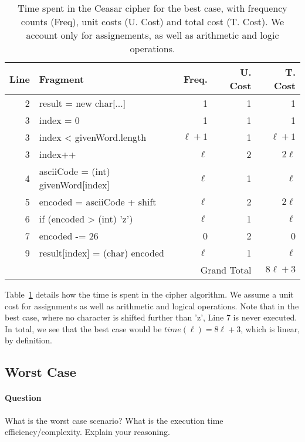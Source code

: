 \documentclass{article}
\begin{document}
\begin{table}[htbp]
  \begin{center}
    \begin{tabular}{r >{\small\ttfamily}l r r r}
      \toprule
      Line & Fragment & Freq. & U. Cost & T. Cost \\
      \midrule
      2 & result = new char[...] & 1 & 1 & 1 \\ 
      3 & index = 0 &  1 & 1 & 1 \\
      3 & index < givenWord.length & $\ell+1$ & 1 & $\ell + 1$ \\
      3 & index++ & $\ell$ & 2 & $2\ell$ \\
      4 & asciiCode = (int) givenWord[index] & $\ell$ & 1 & $\ell$ \\
      5 & encoded = asciiCode + shift & $\ell$ & 2 & $2 \ell$ \\
      6 & if (encoded > (int) 'z') & $\ell$ & 1 & $\ell$ \\
      7 & encoded -= 26 & 0 & 2 & 0 \\
      9 & result[index] = (char) encoded & $\ell$ & 1 & $\ell$ \\
      \midrule
           & & \multicolumn{2}{r}{Grand Total} & $8\ell + 3$ \\
      \bottomrule
    \end{tabular}
  \end{center}
  \caption{Time spent in the Ceasar cipher for the best case, with
    frequency counts (Freq), unit costs (U. Cost) and total cost
    (T. Cost). We account only for assignements, as well as
    arithmetic and logic operations.}
  \label{tab:cipher:best-case}
\end{table}

Table~\ref{tab:cipher:best-case} details how the time is spent in the
cipher algorithm. We assume a unit cost for assignments as well as
arithmetic and logical operations. Note that in the best case, where
no character is shifted further than 'z', Line 7 is never executed. In
total, we see that the best case would be $time(\ell) = 8\ell + 3$,
which is linear, by definition.

\subsection{Worst Case}

\paragraph{Question} What is the worst case scenario? What is the execution
time efficiency/complexity. Explain your reasoning.
\end{document}
